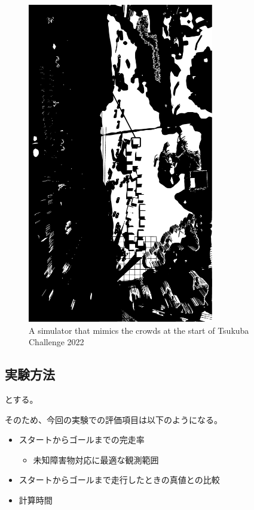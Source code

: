 \documentclass{jarticle}
\begin{document}
\begin{figure}[h]
  \centering
   \includegraphics[height=140mm]{fig/simulator.eps}
   \vspace*{-4mm}
   \caption{A simulator that mimics the crowds at the start of Tsukuba Challenge 2022}
   \label{fig: つくばチャレンジ人混みシミュレータ}
 \end{figure}

\subsection{実験方法}

とする。

そのため、今回の実験での評価項目は以下のようになる。

\begin{itemize}
  \item スタートからゴールまでの完走率
  \begin{itemize}
    \item 未知障害物対応に最適な観測範囲
  \end{itemize}
  \item スタートからゴールまで走行したときの真値との比較
  \item 計算時間
\end{itemize}
\end{document}
